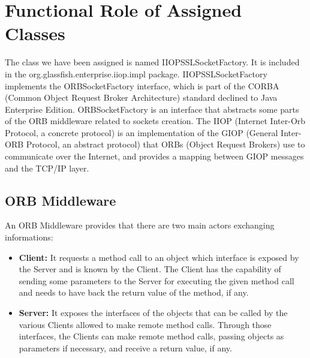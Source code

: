 \section{Functional Role of Assigned Classes}

The class we have been assigned is named IIOPSSLSocketFactory.
It is included in the org.glassfish.enterprise.iiop.impl package.
IIOPSSLSocketFactory implements the ORBSocketFactory interface, which is part of the CORBA (Common Object Request Broker Architecture) standard declined to Java Enterprise Edition.
ORBSocketFactory is an interface that abstracts some parts of the ORB middleware related to sockets creation.
The IIOP (Internet Inter-Orb Protocol, a concrete protocol) is an implementation of the GIOP (General Inter-ORB Protocol, an abstract protocol) that ORBs (Object Request Brokers) use to communicate over the Internet, and provides a mapping between GIOP messages and the TCP/IP layer.

\subsection{ORB Middleware}
An ORB Middleware provides that there are two main actors exchanging informations:
\begin{itemize}
	\item \textbf{Client:}
		It requests a method call to an object which interface is exposed by the Server and is known by the Client.
		The Client has the capability of sending some parameters to the Server for executing the given method call and needs to have back the return value of the method, if any.
	\item \textbf{Server:}
		It exposes the interfaces of the objects that can be called by the various Clients allowed to make remote method calls.
		Through those interfaces, the Clients can make remote method calls, passing objects as parameters if necessary, and receive a return value, if any.
\end{itemize}

